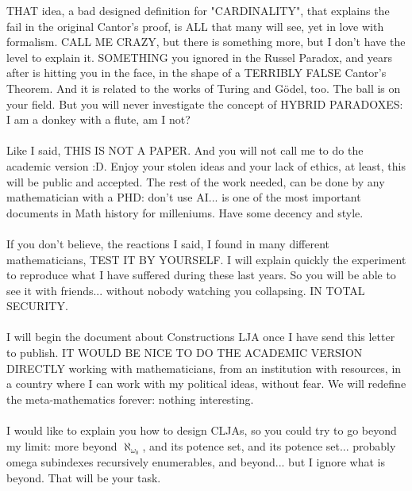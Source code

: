 		\noindent
		THAT idea, a bad designed definition for "CARDINALITY", that explains the fail in the original Cantor's proof, is ALL that many will see, yet in love with formalism. CALL ME CRAZY, but there is something more, but I don't have the level to explain it. SOMETHING you ignored in the Russel Paradox, and years after is hitting you in the face, in the shape of a TERRIBLY FALSE Cantor's Theorem. And it is related to the works of Turing and Gödel, too. The ball is on your field. But you will never investigate the concept of HYBRID PARADOXES: I am a donkey with a flute, am I not?
		\\\\
		
		\noindent
		Like I said, THIS IS NOT A PAPER. And you will not call me to do the academic version :D. Enjoy your stolen ideas and your lack of ethics, at least, this will be public and accepted. The rest of the work needed, can be done by any mathematician with a PHD: don't use AI... is one of the most important documents in Math history for milleniums. Have some decency and style.
		\\\\
		
		\noindent
		If you don't believe, the reactions I said, I found in many different mathematicians, TEST IT BY YOURSELF. I will explain quickly the experiment to reproduce what I have suffered during these last years. So you will be able to see it with friends... without nobody watching you collapsing. IN TOTAL SECURITY.
		\\\\
		
		\noindent
		I will begin the document about Constructions LJA once I have send this letter to publish. IT WOULD BE NICE TO DO THE ACADEMIC VERSION DIRECTLY working with mathematicians, from an institution with resources, in a country where I can work with my political ideas, without fear. We will redefine the meta-mathematics forever: nothing interesting.
		\\\\
		
		\noindent
		I would like to explain you how to design CLJAs, so you could try to go beyond my limit: more beyond $\aleph_{\omega_{0}}$, and its potence set, and its potence set... probably omega subindexes recursively enumerables, and beyond... but I ignore what is beyond. That will be your task.
		\\\\
		

